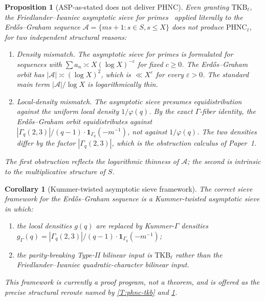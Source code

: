 \documentclass[11pt]{article}
\newtheorem{proposition}{Proposition}
\newtheorem{corollary}{Corollary}
\newcommand{\1}{\mathbf 1}
\begin{document}
\begin{proposition}[ASP-as-stated does not deliver PHNC]\label{P:ASP-fail}
Even granting \(\mathrm{TKB}_\ell\), the Friedlander--Iwaniec asymptotic sieve for primes~\cite{FI} applied literally to the Erd\H{o}s--Graham sequence \(\mathcal A=\{ms+1:s\in S,s\le X\}\) does not produce \(\mathrm{PHNC}_\ell\), for two independent structural reasons:

\begin{enumerate}[leftmargin=2em,label=(\arabic*)]
\item \emph{Density mismatch.}  The asymptotic sieve for primes is formulated for sequences with \(\sum a_n\asymp X(\log X)^{-c}\) for fixed \(c\ge 0\).  The Erd\H{o}s--Graham orbit has \(|\mathcal A|\asymp(\log X)^2\), which is \(\ll X^\varepsilon\) for every \(\varepsilon>0\).  The standard main term \(|\mathcal A|/\log X\) is logarithmically thin.
\item \emph{Local-density mismatch.}  The asymptotic sieve presumes equidistribution against the uniform local density \(1/\varphi(q)\).  By the exact \(\Gamma\)-fiber identity, the Erd\H{o}s--Graham orbit equidistributes against \(|\Gamma_q(2,3)|/(q-1)\cdot\1_{\Gamma_q}(-m^{-1})\), not against \(1/\varphi(q)\).  The two densities differ by the factor \(|\Gamma_q(2,3)|\), which is the obstruction calculus of Paper~1.
\end{enumerate}
The first obstruction reflects the logarithmic thinness of \(\mathcal A\); the second is intrinsic to the multiplicative structure of \(S\).
\end{proposition}

\begin{corollary}[Kummer-twisted asymptotic sieve framework]\label{C:kummer-twisted-ASP}
The correct sieve framework for the Erd\H{o}s--Graham sequence is a Kummer-twisted asymptotic sieve in which:
\begin{enumerate}[leftmargin=2em,label=(\arabic*)]
\item the local densities \(g(q)\) are replaced by Kummer-\(\Gamma\) densities \(g_\Gamma(q)=|\Gamma_q(2,3)|/(q-1)\cdot\1_{\Gamma_q}(-m^{-1})\);
\item the parity-breaking Type-II bilinear input is \(\mathrm{TKB}_\ell\) rather than the Friedlander--Iwaniec quadratic-character bilinear input.
\end{enumerate}
This framework is currently a proof program, not a theorem, and is offered as the precise structural reroute named by \cref{T:phnc-tkb} and \cref{P:ASP-fail}.
\end{corollary}
\end{document}
